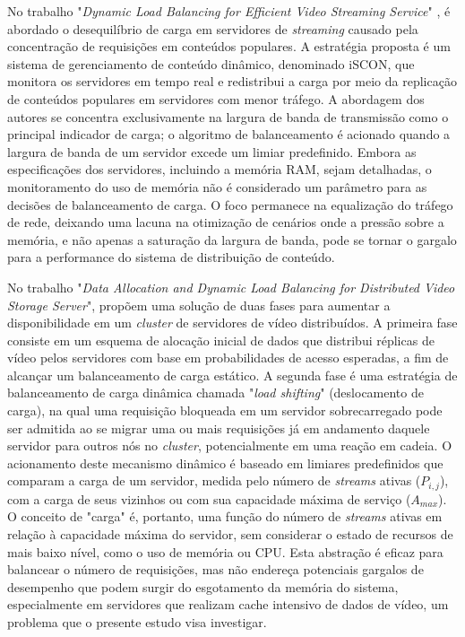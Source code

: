 No trabalho "\textit{Dynamic Load Balancing for Efficient Video Streaming Service}" \cite{dynamicLoadBalancingForEfficientVideoStreamingService2015}, é abordado o desequilíbrio de carga em servidores de \textit{streaming} causado pela concentração de requisições em conteúdos populares. A estratégia proposta é um sistema de gerenciamento de conteúdo dinâmico, denominado iSCON, que monitora os servidores em tempo real e redistribui a carga por meio da replicação de conteúdos populares em servidores com menor tráfego. A abordagem dos autores se concentra exclusivamente na largura de banda de transmissão como o principal indicador de carga; o algoritmo de balanceamento é acionado quando a largura de banda de um servidor excede um limiar predefinido. Embora as especificações dos servidores, incluindo a memória RAM, sejam detalhadas, o monitoramento do uso de memória não é considerado um parâmetro para as decisões de balanceamento de carga. O foco permanece na equalização do tráfego de rede, deixando uma lacuna na otimização de cenários onde a pressão sobre a memória, e não apenas a saturação da largura de banda, pode se tornar o gargalo para a performance do sistema de distribuição de conteúdo.

No trabalho "\textit{Data Allocation and Dynamic Load Balancing for Distributed Video Storage Server}", \cite{dataAllocationAndDynamicLoadBalancingForDistributedVideoStorageServer1999} propõem uma solução de duas fases para aumentar a disponibilidade em um \textit{cluster} de servidores de vídeo distribuídos. A primeira fase consiste em um esquema de alocação inicial de dados que distribui réplicas de vídeo pelos servidores com base em probabilidades de acesso esperadas, a fim de alcançar um balanceamento de carga estático. A segunda fase é uma estratégia de balanceamento de carga dinâmica chamada "\textit{load shifting}" (deslocamento de carga), na qual uma requisição bloqueada em um servidor sobrecarregado pode ser admitida ao se migrar uma ou mais requisições já em andamento daquele servidor para outros nós no \textit{cluster}, potencialmente em uma reação em cadeia. O acionamento deste mecanismo dinâmico é baseado em limiares predefinidos que comparam a carga de um servidor, medida pelo número de \textit{streams} ativas ($P_{i,j}$), com a carga de seus vizinhos ou com sua capacidade máxima de serviço ($A_{max}$). O conceito de "carga" é, portanto, uma função do número de \textit{streams} ativas em relação à capacidade máxima do servidor, sem considerar o estado de recursos de mais baixo nível, como o uso de memória ou CPU. Esta abstração é eficaz para balancear o número de requisições, mas não endereça potenciais gargalos de desempenho que podem surgir do esgotamento da memória do sistema, especialmente em servidores que realizam cache intensivo de dados de vídeo, um problema que o presente estudo visa investigar.

